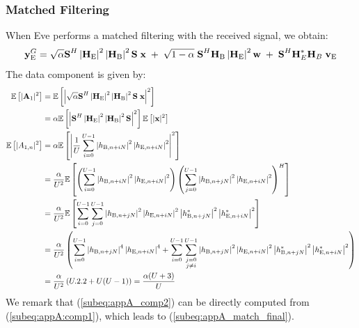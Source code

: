 \subsubsection{Matched Filtering}
When Eve performs a matched filtering with the received signal, we obtain:
\begin{equation}
    \textbf{y}_{\text{E}}^G = \sqrt{\alpha} \textbf{S}^H \left|\textbf{H}_{\text{E}}\right|^2 \left|\textbf{H}_{\text{B}}\right|^2 \textbf{S}\; \textbf{x} \; +  \; \sqrt{1-\alpha} \; \textbf{S}^H \textbf{H}_{\text{B}}\left|\textbf{H}_{\text{E}}\right|^2 \textbf{w}  \; +  \; \textbf{S}^H  \textbf{H}^*_E \textbf{H}_B \;\textbf{v}_{\text{E}}
    \label{eq:appA:rx_eve_filt1}
\end{equation}
The data component is given by:
\begin{subequations}
    \begin{align}
        \mathbb{E} \left[|\textbf{A}_{1}|^2\right] &= \mathbb{E} \left[\left|\sqrt{\alpha} \textbf{S}^H \left|\textbf{H}_{\text{E}}\right|^2 \left|\textbf{H}_{\text{B}}\right|^2 \textbf{S}\; \textbf{x}\right|^2\right] \\
        &= \alpha \mathbb{E} \left[\left| \textbf{S}^H \left|\textbf{H}_{\text{E}}\right|^2 \left|\textbf{H}_{\text{B}}\right|^2 \textbf{S}\right|^2\right] \mathbb{E} \left[|\textbf{x}|^2\right] \\
        \mathbb{E} \left[|A_{1,n}|^2\right] &= \alpha \mathbb{E} \left[\left|\frac{1}{U}\sum_{i=0}^{U-1} \left| h_{\text{B}, n + iN}\right|^2 \left| h_{\text{E}, n + iN}\right|^2\right|^2\right] \\
        &=  \frac{\alpha}{U^2} \mathbb{E} \left[\left(\sum_{i=0}^{U-1} \left| h_{\text{B}, n + iN}\right|^2 \left| h_{\text{E}, n + iN}\right|^2 \right) \left(\sum_{j=0}^{U-1} \left| h_{\text{B}, n + jN}\right|^2 \left| h_{\text{E}, n + iN}\right|^2 \right)^H\right] \label{subeq:appA_comp2} \\
        &= \frac{\alpha}{U^2} \mathbb{E} \left[\sum_{i=0}^{U-1}\sum_{j=0}^{U-1} \left| h_{\text{B}, n + jN}\right|^2 \left| h_{\text{E}, n + iN}\right|^2 \left| h^*_{\text{B}, n + jN}\right|^2 \left| h^*_{\text{E}, n + iN}\right|^2\right] \\
        &= \frac{\alpha}{U^2}\left( \sum_{i=0}^{U-1} \left| h_{\text{B}, n + jN}\right|^4 \left| h_{\text{E}, n + iN}\right|^4 + \sum_{i=0}^{U-1}\sum_{\substack{j=0 \\ j\neq i}}^{U-1}  \left| h_{\text{B}, n + jN}\right|^2 \left| h_{\text{E}, n + iN}\right|^2 \left| h^*_{\text{B}, n + jN}\right|^2 \left| h^*_{\text{E}, n + iN}\right|^2 \right) \\
        &= \frac{\alpha}{U^2} \left(U.2.2 + U(U-1) \right) = \frac{\alpha (U+3)}{U}
        \label{subeq:appA_match_final}
    \end{align} 
    \label{eq:appA:data_eve_filt1}
\end{subequations}
We remark that (\ref{subeq:appA_comp2}) can be directly computed from (\ref{subeq:appA:comp1}), which leads to (\ref{subeq:appA_match_final}).\\

